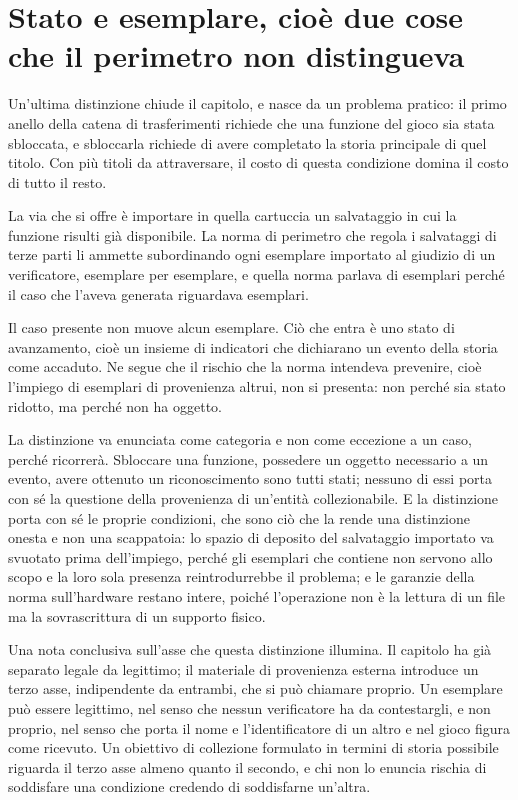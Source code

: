 \section{Stato e esemplare, cioè due cose che il perimetro non distingueva}

Un'ultima distinzione chiude il capitolo, e nasce da un problema pratico: il primo anello della catena di trasferimenti richiede che una funzione del gioco sia stata sbloccata, e sbloccarla richiede di avere completato la storia principale di quel titolo. Con più titoli da attraversare, il costo di questa condizione domina il costo di tutto il resto.

La via che si offre è importare in quella cartuccia un salvataggio in cui la funzione risulti già disponibile. La norma di perimetro che regola i salvataggi di terze parti li ammette subordinando ogni esemplare importato al giudizio di un verificatore, esemplare per esemplare, e quella norma parlava di esemplari perché il caso che l'aveva generata riguardava esemplari.

Il caso presente non muove alcun esemplare. Ciò che entra è uno stato di avanzamento, cioè un insieme di indicatori che dichiarano un evento della storia come accaduto. Ne segue che il rischio che la norma intendeva prevenire, cioè l'impiego di esemplari di provenienza altrui, non si presenta: non perché sia stato ridotto, ma perché non ha oggetto.

La distinzione va enunciata come categoria e non come eccezione a un caso, perché ricorrerà. Sbloccare una funzione, possedere un oggetto necessario a un evento, avere ottenuto un riconoscimento sono tutti stati; nessuno di essi porta con sé la questione della provenienza di un'entità collezionabile. E la distinzione porta con sé le proprie condizioni, che sono ciò che la rende una distinzione onesta e non una scappatoia: lo spazio di deposito del salvataggio importato va svuotato prima dell'impiego, perché gli esemplari che contiene non servono allo scopo e la loro sola presenza reintrodurrebbe il problema; e le garanzie della norma sull'hardware restano intere, poiché l'operazione non è la lettura di un file ma la sovrascrittura di un supporto fisico.

Una nota conclusiva sull'asse che questa distinzione illumina. Il capitolo ha già separato legale da legittimo; il materiale di provenienza esterna introduce un terzo asse, indipendente da entrambi, che si può chiamare proprio. Un esemplare può essere legittimo, nel senso che nessun verificatore ha da contestargli, e non proprio, nel senso che porta il nome e l'identificatore di un altro e nel gioco figura come ricevuto. Un obiettivo di collezione formulato in termini di storia possibile riguarda il terzo asse almeno quanto il secondo, e chi non lo enuncia rischia di soddisfare una condizione credendo di soddisfarne un'altra.
